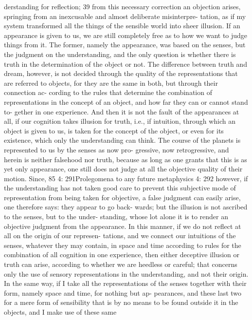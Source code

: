 derstanding for reﬂection; 39 from this necessary correction an objection
arises, springing from an inexcusable and almost deliberate misinterpre-
tation, as if my system transformed all the things of the sensible world
into sheer illusion.
If an appearance is given to us, we are still completely free as to how
we want to judge things from it. The former, namely the appearance,
was based on the senses, but the judgment on the understanding, and
the only question is whether there is truth in the determination of the
object or not. The difference between truth and dream, however, is not
decided through the quality of the representations that are referred to
objects, for they are the same in both, but through their connection ac-
cording to the rules that determine the combination of representations
in the concept of an object, and how far they can or cannot stand to-
gether in one experience. And then it is not the fault of the appearances
at all, if our cognition takes illusion for truth, i.e., if intuition, through
which an object is given to us, is taken for the concept of the object,
or even for its existence, which only the understanding can think. The
course of the planets is represented to us by the senses as now pro-
gressive, now retrogressive, and herein is neither falsehood nor truth,
because as long as one grants that this is as yet only appearance, one
still does not judge at all the objective quality of their motion. Since,
85
4: 291Prolegomena to any future metaphysics
4: 292
however, if the understanding has not taken good care to prevent this
subjective mode of representation from being taken for objective, a false
judgment can easily arise, one therefore says: they appear to go back-
wards; but the illusion is not ascribed to the senses, but to the under-
standing, whose lot alone it is to render an objective judgment from the
appearance.
In this manner, if we do not reﬂect at all on the origin of our represen-
tations, and we connect our intuitions of the senses, whatever they may
contain, in space and time according to rules for the combination of all
cognition in one experience, then either deceptive illusion or truth can
arise, according to whether we are heedless or careful; that concerns only
the use of sensory representations in the understanding, and not their
origin. In the same way, if I take all the representations of the senses
together with their form, namely space and time, for nothing but ap-
pearances, and these last two for a mere form of sensibility that is by no
means to be found outside it in the objects, and I make use of these same
